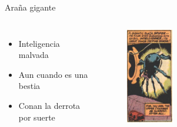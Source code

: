 \begin{frame}{Araña gigante}
  \begin{columns}
    \begin{itemize}
      \item Inteligencia malvada
      \item Aun cuando es una bestia
      \item Conan la derrota por suerte
    \end{itemize}
    \begin{figure}[htb]
      \centering
      \includegraphics[width=0.3\textwidth]{img/tropes/arana}
    \end{figure}
  \end{columns}
\end{frame}
\note{

}

